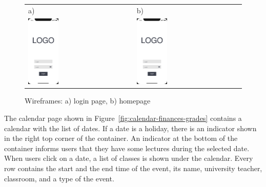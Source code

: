 \begin{figure}[htb]
    \centering
    \begin{tabular}{@{}ll@{}}
        a) & b) \\
        \includegraphics[page=1,width=0.300\textwidth]{fig03/jsos_helper_wireframe.pdf} &
        \includegraphics[page=7,width=0.300\textwidth]{fig03/jsos_helper_wireframe.pdf} \\
    \end{tabular}
    \caption{Wireframes: a) login page, b) homepage} \label{fig:login-home}
\end{figure}

The calendar page shown in Figure~\ref{fig:calendar-finances-grades} contains a calendar with the list of dates. If a date is a holiday, there is an indicator shown in the right top corner of the container. An indicator at the bottom of the container informs users that they have some lectures during the selected date.
When users click on a date, a list of classes is shown under the calendar. Every row contains the start and the end time of the event, its name, university teacher, classroom, and a type of the event.


